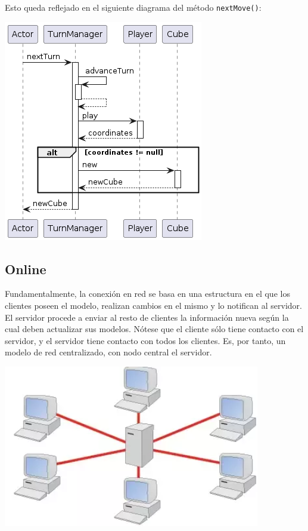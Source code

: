 \documentclass[12pt,a4paper,openright]{book}
\theoremstyle{break}
\begin{document}
Esto queda reflejado en el siguiente diagrama del método \texttt{nextMove()}:

\begin{center}
\includegraphics[scale=0.75]{TurnManager.nextTurn()-sprint7.png} 
\end{center}

\newpage

\subsection{Online}

Fundamentalmente, la conexión en red se basa en una estructura en el que los clientes poseen el modelo, realizan cambios en el mismo y lo notifican al servidor. El servidor procede a enviar al resto de clientes la información nueva según la cual deben actualizar sus modelos. Nótese que el cliente sólo tiene contacto con el servidor, y el servidor tiene contacto con todos los clientes. Es, por tanto, un modelo de red centralizado, con nodo central el servidor.

\begin{center}
\includegraphics[scale=1]{redCentralizada.png} 
\end{center}
\end{document}
